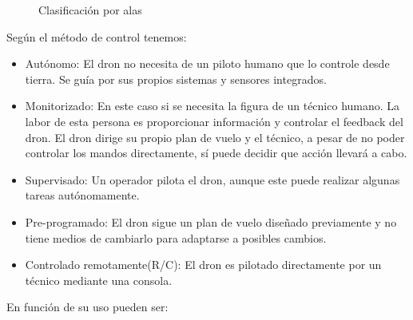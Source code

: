 \begin{figure}[H]
\centering
{}
\caption{Clasificación por alas}
\end{figure}

Según el método de control tenemos:

\begin{itemize}
\item Autónomo: El dron no necesita de un piloto humano que lo controle desde tierra. Se guía por sus propios sistemas y sensores integrados. 
\item Monitorizado: En este caso si se necesita la figura de un técnico humano. La labor de esta persona es proporcionar información y controlar el feedback del dron. El dron dirige su propio plan de vuelo y el técnico, a pesar de no poder controlar los mandos directamente, sí puede decidir que acción llevará a cabo.
\item Supervisado: Un operador pilota el dron, aunque este puede realizar algunas tareas autónomamente.
\item Pre-programado: El dron sigue un plan de vuelo diseñado previamente y no tiene medios de cambiarlo para adaptarse a posibles cambios.
\item Controlado remotamente(R/C): El dron es pilotado directamente por un técnico mediante una consola.
\end{itemize}

En función de su uso pueden ser:

